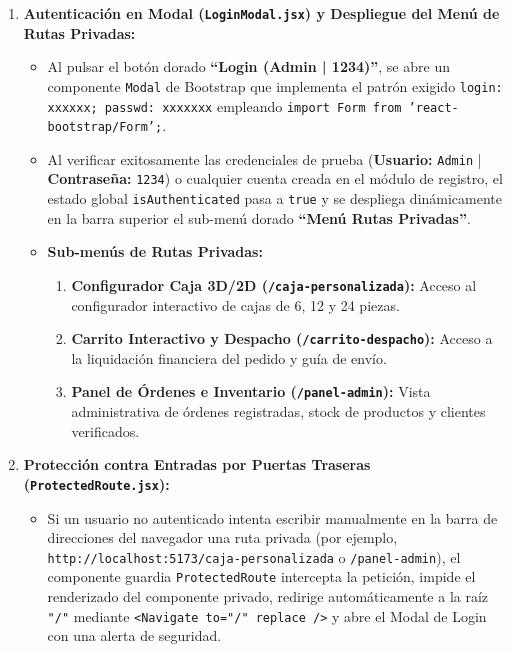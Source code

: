 \documentclass[12pt,letterpaper]{article}
\begin{document}
\begin{enumerate}[leftmargin=1.2cm]
  \item \textbf{Autenticación en Modal (\texttt{LoginModal.jsx}) y Despliegue del Menú de Rutas Privadas:}
    \begin{itemize}
      \item Al pulsar el botón dorado \textbf{``Login (Admin | 1234)''}, se abre un componente \texttt{Modal} de Bootstrap que implementa el patrón exigido \texttt{login: xxxxxx; passwd: xxxxxxx} empleando \texttt{import Form from 'react-bootstrap/Form';}.
      \item Al verificar exitosamente las credenciales de prueba (\textbf{Usuario:} \texttt{Admin} | \textbf{Contraseña:} \texttt{1234}) o cualquier cuenta creada en el módulo de registro, el estado global \texttt{isAuthenticated} pasa a \texttt{true} y se despliega dinámicamente en la barra superior el sub-menú dorado \textbf{``Menú Rutas Privadas''}.
      \item \textbf{Sub-menús de Rutas Privadas:}
        \begin{enumerate}
          \item \textbf{Configurador Caja 3D/2D (\texttt{/caja-personalizada}):} Acceso al configurador interactivo de cajas de 6, 12 y 24 piezas.
          \item \textbf{Carrito Interactivo y Despacho (\texttt{/carrito-despacho}):} Acceso a la liquidación financiera del pedido y guía de envío.
          \item \textbf{Panel de Órdenes e Inventario (\texttt{/panel-admin}):} Vista administrativa de órdenes registradas, stock de productos y clientes verificados.
        \end{enumerate}
    \end{itemize}

  \item \textbf{Protección contra Entradas por Puertas Traseras (\texttt{ProtectedRoute.jsx}):}
    \begin{itemize}
      \item Si un usuario no autenticado intenta escribir manualmente en la barra de direcciones del navegador una ruta privada (por ejemplo, \texttt{http://localhost:5173/caja-personalizada} o \texttt{/panel-admin}), el componente guardia \texttt{ProtectedRoute} intercepta la petición, impide el renderizado del componente privado, redirige automáticamente a la raíz \texttt{"/"} mediante \texttt{<Navigate to="/" replace />} y abre el Modal de Login con una alerta de seguridad.
    \end{itemize}
\end{enumerate}
\end{document}
